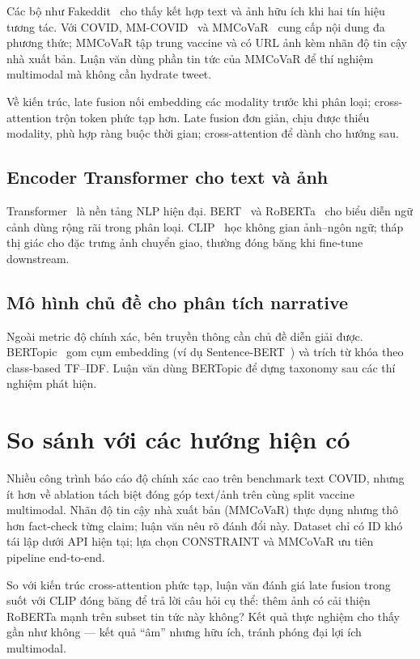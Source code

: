 \documentclass[12pt, a4paper]{report}
\begin{document}
Các bộ như Fakeddit~\cite{nakamura2020fakeddit} cho thấy kết hợp text và ảnh hữu ích khi hai tín hiệu tương tác.
Với COVID, MM-COVID~\cite{li2020mmcovid} và MMCoVaR~\cite{chen2021mmcovar} cung cấp nội dung đa phương thức; MMCoVaR tập trung vaccine và có URL ảnh kèm nhãn độ tin cậy nhà xuất bản.
Luận văn dùng phần tin tức của MMCoVaR để thí nghiệm multimodal mà không cần hydrate tweet.

Về kiến trúc, late fusion nối embedding các modality trước khi phân loại; cross-attention trộn token phức tạp hơn.
Late fusion đơn giản, chịu được thiếu modality, phù hợp ràng buộc thời gian; cross-attention để dành cho hướng sau.

\subsection{Encoder Transformer cho text và ảnh}

Transformer~\cite{vaswani2017attention} là nền tảng NLP hiện đại.
BERT~\cite{devlin2019bert} và RoBERTa~\cite{liu2019roberta} cho biểu diễn ngữ cảnh dùng rộng rãi trong phân loại.
CLIP~\cite{radford2021clip} học không gian ảnh--ngôn ngữ; tháp thị giác cho đặc trưng ảnh chuyển giao, thường đóng băng khi fine-tune downstream.

\subsection{Mô hình chủ đề cho phân tích narrative}

Ngoài metric độ chính xác, bên truyền thông cần chủ đề diễn giải được.
BERTopic~\cite{grootendorst2022bertopic} gom cụm embedding (ví dụ Sentence-BERT~\cite{reimers2019sentence}) và trích từ khóa theo class-based TF--IDF.
Luận văn dùng BERTopic để dựng taxonomy sau các thí nghiệm phát hiện.

\section{So sánh với các hướng hiện có}
\label{sec:comparison}

Nhiều công trình báo cáo độ chính xác cao trên benchmark text COVID, nhưng ít hơn về ablation tách biệt đóng góp text/ảnh trên cùng split vaccine multimodal.
Nhãn độ tin cậy nhà xuất bản (MMCoVaR) thực dụng nhưng thô hơn fact-check từng claim; luận văn nêu rõ đánh đổi này.
Dataset chỉ có ID khó tái lập dưới API hiện tại; lựa chọn CONSTRAINT và MMCoVaR ưu tiên pipeline end-to-end.

So với kiến trúc cross-attention phức tạp, luận văn đánh giá late fusion trong suốt với CLIP đóng băng để trả lời câu hỏi cụ thể: thêm ảnh có cải thiện RoBERTa mạnh trên subset tin tức này không?
Kết quả thực nghiệm cho thấy gần như không --- kết quả ``âm'' nhưng hữu ích, tránh phóng đại lợi ích multimodal.
\end{document}
